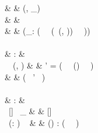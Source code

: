 \begin{figure}[H]
\begin{functioncode}
{                                                                &               &   \quad \quad \quad \quad (\Scopeidvar, \Restrictmapvar_{}) \\
                                                                &               &   \quad \quad \quad \pseudoelse \epsilon \\
                                                                &               &   \pseudoin (\Restrictmapvar_\errbind : ( \ \Restrictstackvar \ (\filterbases \ (\Restrictstatevar, \Scopeidvar)) \ \Simplelocvar \ \true)\errbind) \\~\\

                                                &   :           &   \Restrictstack \rightarrow \Loc \rightarrow \Optiontype{\Restrictstack} \\
         \ \Restrictstackvar \ (\Simplelocvar, \Basesvar)
                                                                &   \triangleq  &   \pseudolet \Restrictstackvar' = ( \ \Restrictstackvar \ (\restricted{\Basesvar}) \ \Simplelocvar \ \false)\errbind \ \pseudoin \\
                                                                &               &   \quad ( \ \Restrictstackvar' \ \Simplelocvar) \\~\\

                                               &   :           &   \Restrictstack \rightarrow \Simpleloc \rightarrow \Restrictstack \\
         \ [] \ \_                             & \triangleq    &   [] \\
         \ (\Restrictmapvar : \Restrictstackvar) \ \Simplelocvar
                                                                &   \triangleq  &   (\Restrictmapvar \setminus \set{(\Simplelocvar, \_)}) : ( \ \Restrictstackvar \ \Simplelocvar) \\~\\

}
\end{functioncode}
\end{figure}
